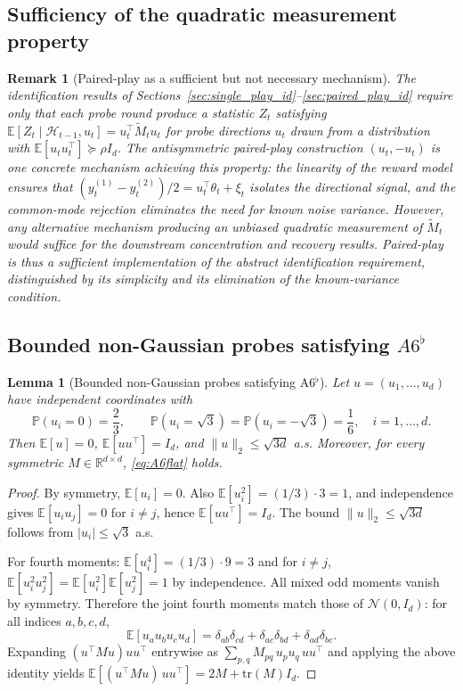 \documentclass[12pt]{article}
\newcommand{\R}{\mathbb{R}}
\newcommand{\E}{\mathbb{E}}
\newcommand{\Prob}{\mathbb{P}}
\newcommand{\cH}{\mathcal{H}}
\newcommand{\tr}{\mathrm{tr}}
\newtheorem{lemma}{Lemma}
\newtheorem{remark}{Remark}
\theoremstyle{plain}
\theoremstyle{definition}
\begin{document}
\subsection{Sufficiency of the quadratic measurement property}

\begin{remark}[Paired-play as a sufficient but not necessary mechanism]
\label{rem:paired_play_sufficient}
The identification results of Sections~\ref{sec:single_play_id}--\ref{sec:paired_play_id} require only that each probe round produce a statistic $Z_t$ satisfying $\E[Z_t \mid \cH_{t-1}, u_t] = u_t^\top \widetilde{M}_t u_t$ for probe directions $u_t$ drawn from a distribution with $\E[u_t u_t^\top] \succeq \rho I_d$. The antisymmetric paired-play construction $(u_t, -u_t)$ is one concrete mechanism achieving this property: the linearity of the reward model ensures that $(y_t^{(1)} - y_t^{(2)})/2 = u_t^\top \theta_t + \xi_t$ isolates the directional signal, and the common-mode rejection eliminates the need for known noise variance. However, any alternative mechanism producing an unbiased quadratic measurement of $\widetilde{M}_t$ would suffice for the downstream concentration and recovery results. Paired-play is thus a \emph{sufficient} implementation of the abstract identification requirement, distinguished by its simplicity and its elimination of the known-variance condition.
\end{remark}

\subsection{\texorpdfstring{Bounded non-Gaussian probes satisfying $A6^\flat$}{Bounded non-Gaussian probes satisfying A6 flat}}


\begin{lemma}[Bounded non-Gaussian probes satisfying A6$^\flat$]
\label{lem:bounded_Q}
Let $u = (u_1, \dots, u_d)$ have independent coordinates with
\[
\Prob(u_i = 0) = \frac{2}{3}, \qquad
\Prob(u_i = \sqrt{3}) = \Prob(u_i = -\sqrt{3}) = \frac{1}{6},
\quad i = 1, \dots, d.
\]
Then $\E[u] = 0$, $\E[uu^\top] = I_d$, and $\|u\|_2 \le \sqrt{3d}$ a.s. Moreover, for every symmetric $M \in \R^{d \times d}$, \eqref{eq:A6flat} holds.
\end{lemma}

\begin{proof}
By symmetry, $\E[u_i] = 0$. Also $\E[u_i^2] = (1/3) \cdot 3 = 1$, and independence gives $\E[u_i u_j] = 0$ for $i \neq j$, hence $\E[uu^\top] = I_d$. The bound $\|u\|_2 \le \sqrt{3d}$ follows from $|u_i| \le \sqrt{3}$ a.s.

For fourth moments: $\E[u_i^4] = (1/3) \cdot 9 = 3$ and for $i \neq j$, $\E[u_i^2 u_j^2] = \E[u_i^2]\E[u_j^2] = 1$ by independence. All mixed odd moments vanish by symmetry. Therefore the joint fourth moments match those of $\mathcal{N}(0, I_d)$: for all indices $a, b, c, d$,
\[
\E[u_a u_b u_c u_d] = \delta_{ab}\delta_{cd} + \delta_{ac}\delta_{bd} + \delta_{ad}\delta_{bc}.
\]
Expanding $(u^\top M u) uu^\top$ entrywise as $\sum_{p,q} M_{pq}\, u_p u_q\, uu^\top$ and applying the above identity yields $\E[(u^\top M u)\, uu^\top] = 2M + \tr(M) I_d$.
\end{proof}
\end{document}
